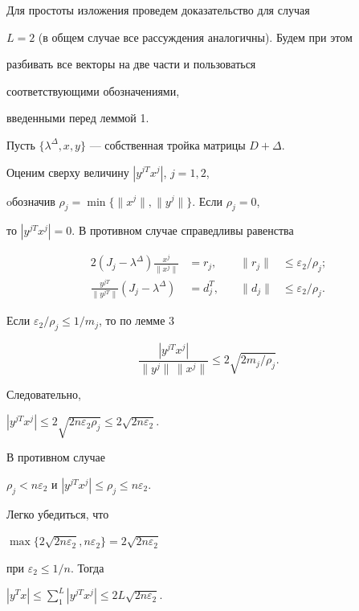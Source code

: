 \begin{pf}


Для простоты изложения проведем доказательство для случая


$L=2$ (в общем случае все рассуждения аналогичны). Будем при этом


разбивать все векторы на две части и пользоваться


соответствующими обозначениями,


введенными перед леммой 1.





Пусть $\{\lambda^{\Delta},x,y\}$ --- собственная тройка матрицы $D+\Delta$.


Оценим сверху величину $|y^{j T} x^j|$, $j=1,2$,


oбозначив $\rho_j=\min\{\|x^j\|,


\|y^j\|\}$. Если $\rho_j=0$,


то $|y^{j T} x^j|=0$. В противном случае справедливы равенства


\begin{alignat*}{2}


(J_j-\lambda^{\Delta})\frac{x^{j}}{\|x^{j}\|}&= r_j,&\quad


\|r_j\|&\le \varepsilon_2/\rho_j;\\


\frac{y^{jT}}{\|y^{jT}\|}(J_j-\lambda^{\Delta})&= d^T_j,&\quad


\|d_j\|&\le \varepsilon_2/\rho_j.


\end{alignat*}


Если $\varepsilon_2/\rho_j\le 1/m_j$, то по лемме 3


$$


\frac{|y^{jT}x^{j}|}{\|y^{j}\|\,\|x^{j}\|}\le 2\sqrt{2 m_j/


\rho_j}.


$$


Следовательно,


$|y^{jT}x^{j}|\le 2\sqrt{2 n\varepsilon_2 \rho_j}\le 2\sqrt{2 n\varepsilon_2}$.


В противном случае


$\rho_j<n\varepsilon_2$ и $|y^{jT}x^{j}|\le \rho_j\le n\varepsilon_2$.


Легко убедиться, что


$\max\{2\sqrt{2 n\varepsilon_2},n\varepsilon_2\}=2\sqrt{2n\varepsilon_2}$


при $\varepsilon_2\le 1/n$. Тогда


$|y^T x|\le \sum_1^L|y^{j T}x^j|\le 2L\sqrt{2n\varepsilon_2}$.


\end{pf}





